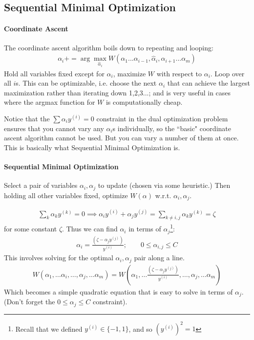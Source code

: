 \documentclass[letterpaper,10pt]{article}
\begin{document}
\subsection{Sequential Minimal Optimization}

\paragraph{Coordinate Ascent}

The coordinate ascent algorithm boils down to repeating and looping:
\begin{align}
\alpha_i += \arg \max_{\hat \alpha_i} W(\alpha_1 ... \alpha_{i-1}, \hat \alpha_i, \alpha_{i+1} ... \alpha_m)
\end{align}
Hold all variables fixed except for $\alpha_i$, maximize $W$ with respect to $\alpha_i$. Loop over all $i$s. This can be optimizable, i.e. choose the next $\alpha_i$ that can achieve the largest maximization rather than iterating down 1,2,3...; and is very useful in cases where the argmax function for $W$ is computationally cheap.

Notice that the $\sum \alpha_i y^{(i)} = 0$ constraint in the dual optimization problem ensures that you cannot vary any $\alpha_i$s individually, so the ``basic" coordinate ascent algorithm cannot be used. But you can vary a number of them at once. This is basically what Sequential Minimal Optimization is.

\paragraph{Sequential Minimal Optimization} 

Select a pair of variables $\alpha_i, \alpha_j$ to update (chosen via some heuristic.) Then holding all other variables fixed, optimize $W(\alpha)$ w.r.t. $\alpha_i, \alpha_j$.

\begin{align}
\sum_k \alpha_k y^{(k)} = 0 \implies \alpha_i y^{(i)} + \alpha_j y^{(j)} = \sum_{k\neq i,j} \alpha_k y^{(k)} = \zeta
\end{align}
for some constant $\zeta$. Thus we can find $\alpha_i$ in terms of $\alpha_j$\footnote{Recall that we defined $y^{(i)} \in \{-1, 1\}$, and so $(y^{(i)})^2 = 1$}:
\begin{align}
\alpha_i = \frac{(\zeta - \alpha_j y^{(j)})}{y^{(i)}}; \qquad 0\leq \alpha_{i,j} \leq C
\end{align}
This involves solving for the optimal $\alpha_i, \alpha_j$ pair along a line.
\begin{align}
W(\alpha_1,\ldots \alpha_i, \ldots, \alpha_j, \ldots \alpha_m) = W(\alpha_1,\ldots \frac{(\zeta - \alpha_j y^{(j)})}{y^{(i)}}, \ldots, \alpha_j, \ldots \alpha_m)
\end{align}
Which becomes a simple quadratic equation that is easy to solve in terms of $\alpha_j$. (Don't forget the $0 \leq \alpha_j \leq C$ constraint).
\end{document}
